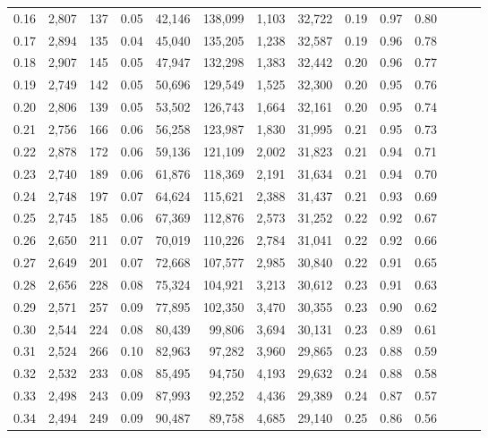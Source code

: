 \begin{tabular}{rrrrrrrrrrrrrr}
0.16 &  2,807 &  137 &  0.05 &   42,146 &  138,099 &   1,103 &  32,722 &  0.19 &  0.97 &      0.80 \\
0.17 &  2,894 &  135 &  0.04 &   45,040 &  135,205 &   1,238 &  32,587 &  0.19 &  0.96 &      0.78 \\
0.18 &  2,907 &  145 &  0.05 &   47,947 &  132,298 &   1,383 &  32,442 &  0.20 &  0.96 &      0.77 \\
0.19 &  2,749 &  142 &  0.05 &   50,696 &  129,549 &   1,525 &  32,300 &  0.20 &  0.95 &      0.76 \\
0.20 &  2,806 &  139 &  0.05 &   53,502 &  126,743 &   1,664 &  32,161 &  0.20 &  0.95 &      0.74 \\
0.21 &  2,756 &  166 &  0.06 &   56,258 &  123,987 &   1,830 &  31,995 &  0.21 &  0.95 &      0.73 \\
0.22 &  2,878 &  172 &  0.06 &   59,136 &  121,109 &   2,002 &  31,823 &  0.21 &  0.94 &      0.71 \\
0.23 &  2,740 &  189 &  0.06 &   61,876 &  118,369 &   2,191 &  31,634 &  0.21 &  0.94 &      0.70 \\
0.24 &  2,748 &  197 &  0.07 &   64,624 &  115,621 &   2,388 &  31,437 &  0.21 &  0.93 &      0.69 \\
0.25 &  2,745 &  185 &  0.06 &   67,369 &  112,876 &   2,573 &  31,252 &  0.22 &  0.92 &      0.67 \\
0.26 &  2,650 &  211 &  0.07 &   70,019 &  110,226 &   2,784 &  31,041 &  0.22 &  0.92 &      0.66 \\
0.27 &  2,649 &  201 &  0.07 &   72,668 &  107,577 &   2,985 &  30,840 &  0.22 &  0.91 &      0.65 \\
0.28 &  2,656 &  228 &  0.08 &   75,324 &  104,921 &   3,213 &  30,612 &  0.23 &  0.91 &      0.63 \\
0.29 &  2,571 &  257 &  0.09 &   77,895 &  102,350 &   3,470 &  30,355 &  0.23 &  0.90 &      0.62 \\
0.30 &  2,544 &  224 &  0.08 &   80,439 &   99,806 &   3,694 &  30,131 &  0.23 &  0.89 &      0.61 \\
0.31 &  2,524 &  266 &  0.10 &   82,963 &   97,282 &   3,960 &  29,865 &  0.23 &  0.88 &      0.59 \\
0.32 &  2,532 &  233 &  0.08 &   85,495 &   94,750 &   4,193 &  29,632 &  0.24 &  0.88 &      0.58 \\
0.33 &  2,498 &  243 &  0.09 &   87,993 &   92,252 &   4,436 &  29,389 &  0.24 &  0.87 &      0.57 \\
0.34 &  2,494 &  249 &  0.09 &   90,487 &   89,758 &   4,685 &  29,140 &  0.25 &  0.86 &      0.56 \\

\end{tabular}
